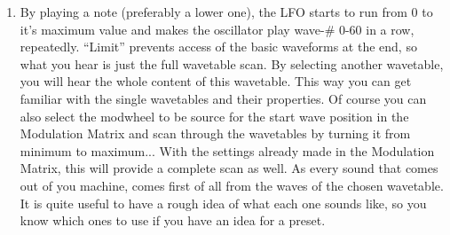 \begin{enumerate}
	\item By playing a note (preferably a lower one), the LFO starts to run from 0 to it's maximum value and makes the oscillator play wave-\# 0-60 in a row, repeatedly. ``Limit'' prevents access of the basic waveforms at the end, so what you hear is just the full wavetable scan. By selecting another wavetable, you will hear the whole content of this wavetable. This way you can get familiar with the single wavetables and their properties. Of course you can also select the modwheel to be source for the start wave position in the Modulation Matrix and scan through the wavetables by turning it from minimum to maximum... With the settings already made in the Modulation Matrix, this will provide a complete scan as well. As every sound that comes out of you machine, comes first of all from the waves of the chosen wavetable. It is quite useful to have a rough idea of what each one sounds like, so you know which ones to use if you have an idea for a preset.
\end{enumerate}
